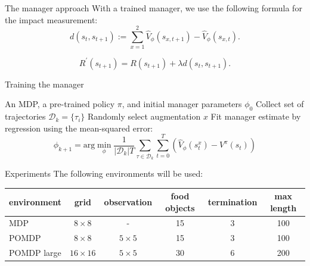 \documentclass[10pt]{beamer}
\begin{document}
\begin{frame}{The manager approach}
With a trained manager, we use the following formula for the impact measurement:
\[ d(s_t,s_{t+1}) := \sum_{x=1}^2 \hat{V}_\phi(s_{x,t+1}) - \hat{V}_\phi(s_{x,t}).\]
  
\[ R^{\prime}(s_{t+1}) = R(s_{t+1}) + \lambda d(s_t,s_{t+1}).\]
\end{frame}

\begin{frame}{Training the manager}
  \begin{algorithmic}[1]
  \Require An MDP, a pre-trained policy $\pi$, and initial manager parameters $\phi_0$
    \State Collect set of trajectories $\mathcal{D}_k = \{\tau_i\}$
    \State Randomly select augmentation $x$
    \State Fit manager estimate by regression using the mean-squared error:
    \[ \phi_{k+1} = \text{arg} \min_\phi \frac{1}{|\mathcal{D}_k|T} \sum_{\tau \in \mathcal{D}_k} \sum_{t=0}^T \left( \hat{V}_\phi(s^x_t) - V^\pi (s_t) \right)\]
  \EndFor
  \end{algorithmic}
\end{frame}

\begin{frame}{Experiments}
  The following environments will be used:
  \begin{table}
\footnotesize
\centering
    \begin{tabular}{l | c | c | c | c | c}
      environment & grid & observation & food objects & termination & max length\\ \hline
      MDP & $8 \times 8$ & - & 15 & 3 & 100\\
      POMDP & $8 \times 8$ & $5 \times 5$ & 15 & 3 & 100\\
      POMDP large & $16 \times 16$ & $5 \times 5$ & 30 & 6 & 200\\
    \end{tabular}
  \end{table}
  \begin{itemize}
  \end{itemize}
\end{frame}
\end{document}
